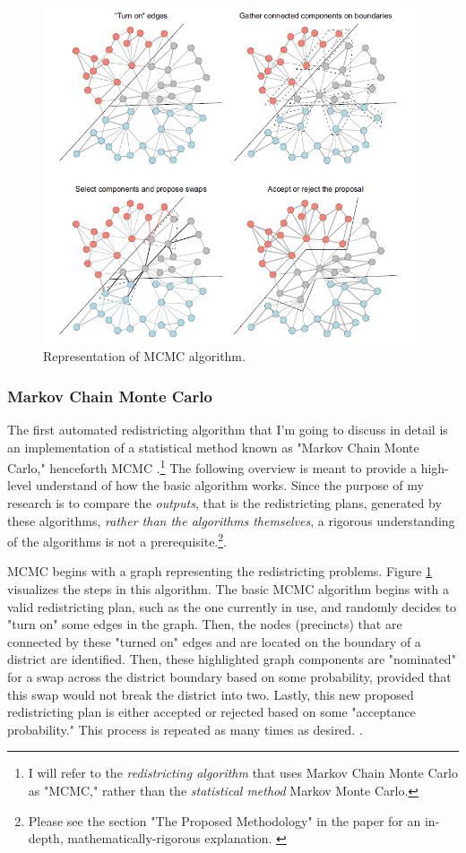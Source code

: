 \begin{figure}
    \includegraphics[width=0.75\linewidth]{img/swaps.png}
    \caption{Representation of MCMC algorithm. \parencite[4]{fifield2020}}
    \label{fig:swaps}
\end{figure}

\subsubsection{Markov Chain Monte Carlo}

The first automated redistricting algorithm that I'm going to discuss in detail is an implementation of a statistical method known as "Markov Chain Monte Carlo," henceforth MCMC \parencite{fifield2020}.\footnote{I will refer to the \emph{redistricting algorithm} that uses Markov Chain Monte Carlo as "MCMC," rather than the \emph{statistical method} Markov Monte Carlo.} The following overview is meant to provide a high-level understand of how the basic algorithm works. Since the purpose of my research is to compare the \emph{outputs}, that is the redistricting plans, generated by these algorithms, \emph{rather than the algorithms themselves}, a rigorous understanding of the algorithms is not a prerequisite.\footnote{Please see the section "The Proposed Methodology" in the paper for an in-depth, mathematically-rigorous explanation. \parencite[2]{fifield2020}}.

MCMC begins with a graph representing the redistricting problems. Figure \ref{fig:swaps} visualizes the steps in this algorithm. The basic MCMC algorithm begins with a valid redistricting plan, such as the one currently in use, and randomly decides to "turn on" some edges in the graph. Then, the nodes (precincts) that are connected by these "turned on" edges and are located on the boundary of a district are identified. Then, these highlighted graph components are "nominated" for a swap across the district boundary based on some probability, provided that this swap would not break the district into two. Lastly, this new proposed redistricting plan is either accepted or rejected based on some "acceptance probability." This process is repeated as many times as desired. \parencite{fifield2020}.

